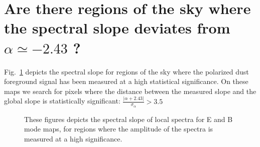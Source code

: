 \documentclass[12pt]{article}
\begin{document}
\begin{figure}[!h]
 \hspace{-0.2cm}
 \hspace{-0.2cm}
 \hspace{-0.2cm}
 \hspace{-0.2cm}
 \hspace{-0.2cm}
 \hspace{-0.2cm}
 \hspace{-0.2cm}
 \hspace{-0.2cm}
 \hspace{-0.2cm}
 \hspace{-0.2cm}
\caption{}
\end{figure}

\section{Are there regions of the sky where the spectral slope deviates from $\alpha \simeq-2.43$ ? }
Fig.~\ref{fig:eb_slope} depicts the spectral slope for regions of the sky where the polarized dust foreground signal has been measured at a high statistical significance. On these maps we search for pixels where the distance between the measured slope and the global slope is statistically significant: $\frac{|\alpha + 2.43|}{\sigma_{\alpha}} > 3.5$ 
\begin{figure}[!h]
\centering
{}
\caption{These figures depicts the spectral slope of local spectra for E and B mode maps, for regions where the amplitude of the spectra is measured at a high significance.}
\label{fig:eb_slope}
\end{figure}
\end{document}
